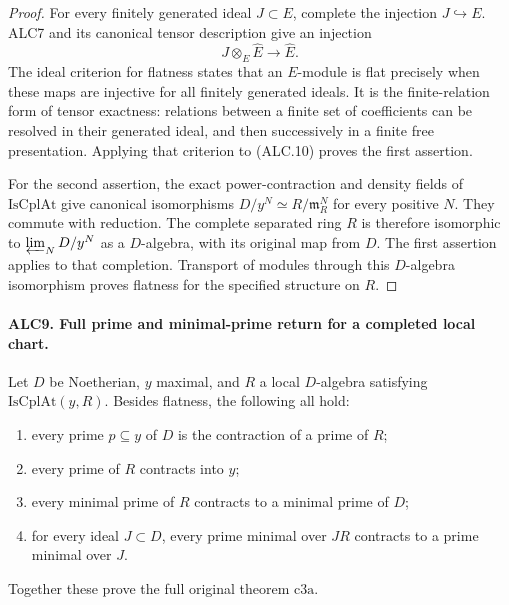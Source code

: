 \documentclass[11pt,a4paper]{article}
\numberwithin{equation}{section}
\theoremstyle{remark}\newtheorem{remark}[theorem]{Remark}
\begin{document}
\begin{proof}
For every finitely generated ideal \(J\subset E\), complete
the injection \(J\hookrightarrow E\).  ALC7 and its
canonical tensor description give an injection
\[
              J\otimes_E\widehat E\longrightarrow\widehat E.
                                                        \tag{ALC.10}
\]
The ideal criterion for flatness states that an \(E\)-module
is flat precisely when these maps are injective for all
finitely generated ideals.  It is the finite-relation form
of tensor exactness: relations between a finite set of
coefficients can be resolved in their generated ideal, and
then successively in a finite free presentation.  Applying
that criterion to (ALC.10) proves the first assertion.

For the second assertion, the exact power-contraction and
density fields of \(\mathrm{IsCplAt}\) give canonical
isomorphisms \(D/y^N\simeq R/\mathfrak m_R^N\) for
every positive \(N\).  They commute with reduction.  The
complete separated ring \(R\) is therefore isomorphic to
\(\varprojlim_ND/y^N\) as a \(D\)-algebra, with its
original map from \(D\).  The first assertion applies to
that completion.  Transport of modules through this
\(D\)-algebra isomorphism proves flatness for the specified
structure on \(R\).
\end{proof}

\paragraph{ALC9. Full prime and minimal-prime return for a completed local chart.}
\label{claim:ALC9}
Let \(D\) be Noetherian, \(y\) maximal, and \(R\) a
local \(D\)-algebra satisfying \(\mathrm{IsCplAt}(y,R)\).
Besides flatness, the following all hold:
\begin{enumerate}
\item every prime \(p\subseteq y\) of \(D\) is the
contraction of a prime of \(R\);
\item every prime of \(R\) contracts into \(y\);
\item every minimal prime of \(R\) contracts to a minimal
prime of \(D\);
\item for every ideal \(J\subset D\), every prime minimal
over \(JR\) contracts to a prime minimal over \(J\).
\end{enumerate}
Together these prove the full original theorem \(\mathrm{c3a}\).
\end{document}

